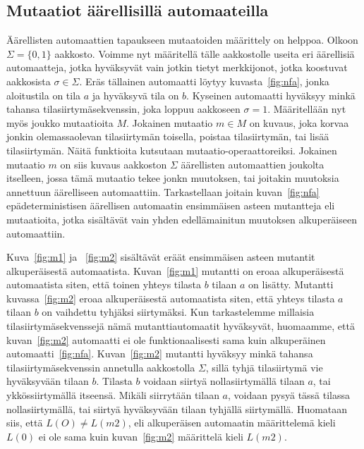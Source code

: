 \documentclass{tktltiki}
\begin{document}
\subsection{Mutaatiot äärellisillä automaateilla}
Äärellisten automaattien tapaukseen mutaatoiden määrittely on helppoa. Olkoon $\Sigma=\{0,1\}$ aakkosto. Voimme nyt määritellä tälle aakkostolle useita eri äärellisiä automaatteja, jotka hyväksyvät vain jotkin tietyt merkkijonot, jotka koostuvat aakkosista $\sigma \in \Sigma$. Eräs tällainen automaatti löytyy kuvasta~\ref{fig:nfa}, jonka aloitustila on tila $a$ ja hyväksyvä tila on $b$. Kyseinen automaatti hyväksyy minkä tahansa tilasiirtymäsekvenssin, joka loppuu aakkoseen $\sigma = 1$. Määritellään nyt myös joukko mutaatioita $M$. Jokainen mutaatio $m\in M$ on kuvaus, joka korvaa jonkin olemassaolevan tilasiirtymän toisella, poistaa tilasiirtymän, tai lisää tilasiirtymän. Näitä funktioita kutsutaan mutaatio-operaattoreiksi. Jokainen mutaatio $m$ on siis kuvaus aakkoston $\Sigma$ äärellisten automaattien joukolta itselleen, jossa tämä mutaatio tekee jonkn muutoksen, tai joitakin muutoksia annettuun äärelliseen automaattiin. Tarkastellaan joitain kuvan~\ref{fig:nfa} epädeterministisen äärellisen automaatin ensimmäisen asteen mutantteja eli mutaatioita, jotka sisältävät vain yhden edellämainitun muutoksen alkuperäiseen automaattiin. 

Kuva~\ref{fig:m1} ja ~\ref{fig:m2} sisältävät eräät ensimmäisen asteen mutantit alkuperäisestä automaatista. Kuvan~\ref{fig:m1} mutantti on eroaa alkuperäisestä automaatista siten, että toinen yhteys tilasta $b$ tilaan $a$ on lisätty. Mutantti kuvassa~\ref{fig:m2} eroaa alkuperäisestä automaatista siten, että yhteys tilasta $a$ tilaan $b$ on vaihdettu tyhjäksi siirtymäksi. Kun tarkastelemme millaisia tilasiirtymäsekvenssejä nämä mutanttiautomaatit hyväksyvät, huomaamme, että kuvan~\ref{fig:m2} automaatti ei ole funktionaalisesti sama kuin alkuperäinen automaatti~\ref{fig:nfa}. Kuvan~\ref{fig:m2} mutantti hyväksyy minkä tahansa tilasiirtymäsekvenssin annetulla aakkostolla $\Sigma$, sillä tyhjä tilasiirtymä vie hyväksyvään tilaan $b$. Tilasta $b$ voidaan siirtyä nollasiirtymällä tilaan $a$, tai ykkössiirtymällä itseensä. Mikäli siirrytään tilaan $a$, voidaan pysyä tässä tilassa nollasiirtymällä, tai siirtyä hyväksyvään tilaan tyhjällä siirtymällä. Huomataan siis, että $L(O) \neq L(m2)$, eli alkuperäisen automaatin määrittelemä kieli $L(0)$ ei ole sama kuin kuvan~\ref{fig:m2} määrittelä kieli $L(m2)$.
\end{document}
